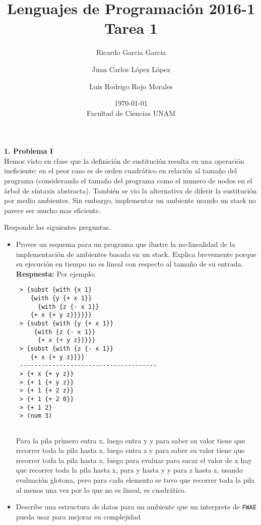 \documentclass[letterpaper,11pt]{article}
\title{Lenguajes de Programación 2016-1\\Tarea 1}
\author{Ricardo Garcia Garcia \and  Juan Carlos López López \and Luis Rodrigo Rojo Morales}
\date{\today\\ Facultad de Ciencias UNAM}
\begin{document}
 
 \maketitle
 
 {\bf 1. Problema I}
 \\
 Hemos visto en clase que la definición de sustitución resulta en una operación ineficiente: en el peor caso es de orden cuadrático en relación al tamaño del programa (considerando el tamaño del programa como el numero de nodos en el árbol de sintaxis abstracta). También se vio la alternativa de diferir la sustitución por medio ambientes. Sin embargo, implementar un ambiente usando un stack no parece ser mucho mas eficiente.

 Responde las siguientes preguntas.
 \begin{itemize}
 \item Provee un esquema para un programa que ilustre la no-linealidad de la implementación de ambientes basada en un stack. Explica brevemente porque su ejecución en tiempo no es lineal con respecto al tamaño de su entrada.
 \\
 \textbf{Respuesta:} 
 Por ejemplo:
 
 \begin{verbatim}
 > {subst {with {x 1}
    {with {y {+ x 1}}
      {with {z {- x 1}}
	{+ x {+ y z}}}}}}
 > {subst {with {y {+ x 1}}
     {with {z {- x 1}}
      {+ x {+ y z}}}}}
 > {subst {with {z {- x 1}}
    {+ x {+ y z}}}}
 --------------------------------------
 > {+ x {+ y z}}
 > {+ 1 {+ y z}}
 > {+ 1 {+ 2 z}}
 > {+ 1 {+ 2 0}}
 > {+ 1 2}
 > (num 3)
 
 \end{verbatim}

 
 Para la pila primero entra x, luego entra y y para saber su valor tiene que recorrer toda la pila hasta x, luego entra z
 y para saber su valor tiene que recorrer toda la pila hasta x, luego para evaluar para sacar el valor de x hay que recorrer
 toda la pila hasta x, para y hasta y y para z hasta z, usando evaluación glotona, pero para cada elemento se tuvo que recorrer
 toda la pila al menos una vez por lo que no es lineal, es cuadrático.
 
 \item Describe una estructura de datos para un ambiente que un interprete de \texttt{FWAE} pueda usar para mejorar su complejidad


\end{itemize}
\end{document}
